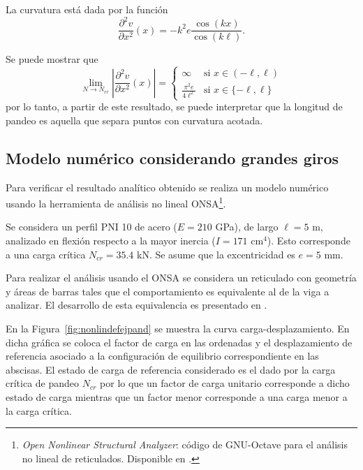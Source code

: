 La curvatura está dada por la función 
\begin{equation}
\frac{\partial^2 v}{\partial x^2}(x) = -k^2 e \frac{\cos(k x)}{\cos(k\ell)}.
\end{equation}


Se puede mostrar que
\begin{equation}
\lim\limits_{N\rightarrow N_{cr}}
\left| \frac{\partial^2 v}{\partial x^2}(x) \right|
 =
\left\{
\begin{array}{lr}
\infty & \text{si } x \in (-\ell,\ell)\\
\displaystyle \frac{\pi^2 e}{4 \ell^2} & \text{si } x \in \{-\ell,\ell\}
\end{array}
\right.
\end{equation}
%
por lo tanto, a partir de este resultado, se puede interpretar que la longitud de pandeo es aquella que separa puntos con curvatura acotada.

\subsection{Modelo numérico considerando grandes giros}

Para verificar el resultado analítico obtenido se realiza un modelo numérico usando la herramienta de análisis no lineal ONSA\footnote{\textit{Open Nonlinear Structural Analyzer}: código de GNU-Octave para el análisis no lineal de reticulados. Disponible en \citep{Bazzano2017}.}.

Se considera un perfil PNI 10 de acero ($E=210 $ GPa), de largo $\ell=5$ m, analizado en flexión respecto a la mayor inercia ($I= 171$ cm$^4$). %
%
Esto corresponde a una carga crítica $N_{cr}=35.4 $ kN. %
%
Se asume que la excentricidad es $e=5$ mm.


Para realizar el análisis usando el ONSA se considera un reticulado con geometría y áreas de barras tales que el comportamiento es equivalente al de la viga a analizar. %
El desarrollo de esta equivalencia es presentado en \citep{Bazzano2017}. %


En la Figura~\ref{fig:nonlindefejpand} se muestra la curva carga-desplazamiento. %
%
En dicha gráfica se coloca el factor de carga en las ordenadas y el desplazamiento de referencia asociado a la configuración de equilibrio correspondiente en las abscisas. %
%
El estado de carga de referencia considerado es el dado por la carga crítica de pandeo $N_{cr}$ por lo que un factor de carga unitario corresponde a dicho estado de carga mientras que un factor menor corresponde a una carga menor a la carga crítica. %


